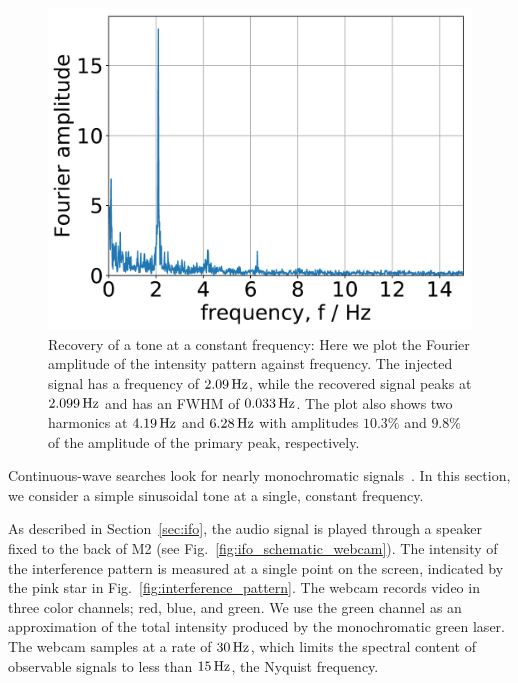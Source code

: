\documentclass[paper-main.tex]{subfiles}
\begin{document}
\begin{figure}
	\includegraphics[width=.5\textwidth]{figures/webcam_spectrum_expt_4_0209.pdf}
	\caption{\label{fig:webcam_spectrum}
Recovery of a tone at a constant frequency: Here we plot the Fourier amplitude of the intensity pattern against frequency.
The injected signal has a frequency of $2.09\,{\rm Hz}$, while the recovered signal peaks at $2.099\,{\rm Hz}$ and has an FWHM of $0.033\,{\rm Hz}$.
The plot also shows two harmonics at $4.19\,{\rm Hz}$ and $6.28\,{\rm Hz}$ with amplitudes $10.3 \%$ and $9.8 \%$ of the amplitude of the primary peak, respectively.
}	
\end{figure}



Continuous-wave searches look for nearly monochromatic signals~\cite{JKS:1998}. In this section, we consider a simple sinusoidal tone at a single, constant frequency. %

As described in Section~\ref{sec:ifo}, the audio signal is played through a speaker fixed to the back of M2 (see Fig.~\ref{fig:ifo_schematic_webcam}). 
The intensity of the interference pattern is measured at a single point on the screen, indicated by the pink star in Fig.~\ref{fig:interference_pattern}. 
The webcam records video in three color channels; red, blue, and green. 
We use the green channel as an approximation of the total intensity produced by the monochromatic green laser.
The webcam samples at a rate of $30\, {\rm Hz}$, which limits the spectral content of observable signals to less than $15\,{\rm Hz}$, the Nyquist frequency. 


\end{document}
